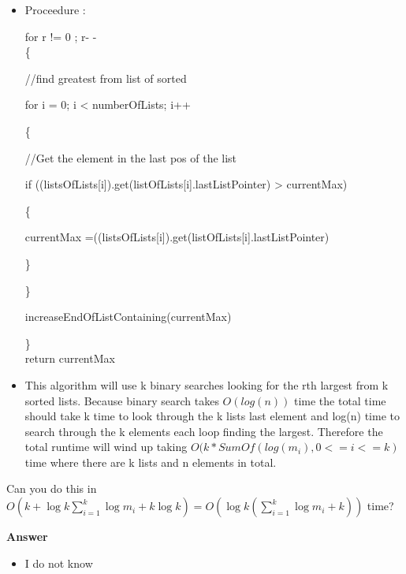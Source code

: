 \documentclass{article}
\begin{document}
\begin{enumerate}
\begin{itemize}
\item Proceedure : 

for r != 0 ; r- -\\
\{

\qquad //find greatest from list of sorted

\qquad for i = 0; i < numberOfLists; i++

\qquad \{

\qquad \qquad //Get the element in the last pos of the list

\qquad \qquad if ((listsOfLists[i]).get(listOfLists[i].lastListPointer) > currentMax)

\qquad \qquad \{

\qquad \qquad \qquad currentMax =((listsOfLists[i]).get(listOfLists[i].lastListPointer)

\qquad \qquad \}

\qquad \}

\qquad increaseEndOfListContaining(currentMax)

\}\\
return currentMax\\

\item This algorithm will use k binary searches looking for the rth largest from k sorted lists. Because binary search takes $O(log(n))$ time the total time should take k time to look through the k lists last element and log(n) time to search through the k elements each loop finding the largest. Therefore the total runtime will wind up taking $O(k * SumOf( log(m_{i}), 0 <= i <= k)$ time where there are k lists and n elements in total.
\end{itemize}

Can you do this in $O(k+\log k \sum_{i=1}^{k}\log m_{i}+k\log k) = O(\log k (\sum_{i=1}^{k}\log m_{i}+k))$ time?

\textbf{ Answer }
\begin{itemize}
\item I do not know
\end{itemize}

\end{enumerate}
\end{document}
